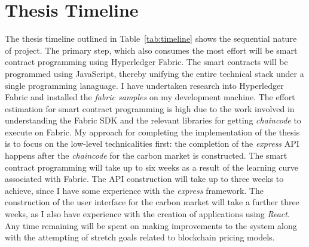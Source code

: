 \section{Thesis Timeline}
The thesis timeline outlined in Table~\ref{tab:timeline}
shows the sequential nature of project. The primary
step, which also consumes the most effort will be smart
contract programming using Hyperledger Fabric. The smart
contracts will be programmed using JavaScript, thereby
unifying the entire technical stack under a single programming
lanaguage. I have undertaken research into Hyperledger
Fabric and installed the \textit{fabric samples} on my
development machine. The effort estimation for smart
contract programming is high due to the work involved in
understanding the Fabric SDK and the relevant libraries
for getting \textit{chaincode} to execute on Fabric.
My approach for completing the implementation of the thesis
is to focus on the low-level technicalities first: the completion of the \textit{express} API happens
after the \textit{chaincode} for the carbon market is
constructed. The smart contract programming will take
up to six weeks as a result of the learning curve
associated with Fabric. The API construction will take
up to three weeks to achieve, since I have some experience
with the \textit{express} framework. The construction of the
user interface for the carbon market will take a further three
weeks, as I also have experience with the creation of
applications using \textit{React}. Any time remaining will
be spent on making improvements to the system along with the
attempting of stretch goals related to blockchain pricing models.
